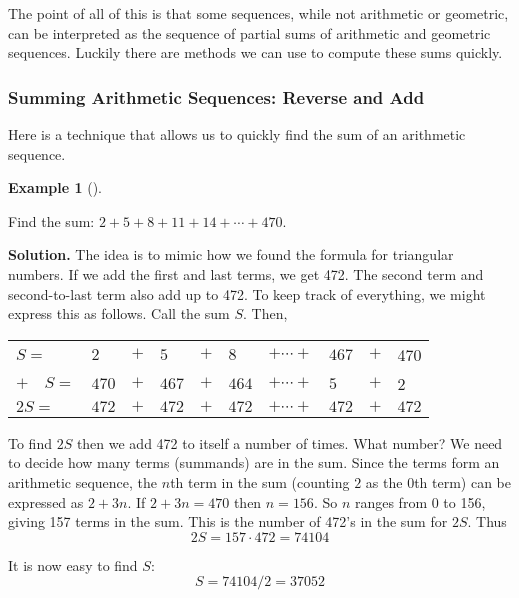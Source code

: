 \documentclass[10pt,]{book}
\theoremstyle{plain}
\theoremstyle{definition}
\newtheorem{example}[theorem]{Example}
\theoremstyle{definition}
\theoremstyle{definition}
\numberwithin{equation}{chapter}
\newcommand{\hrulethin}  {\noalign{\hrule height 0.04em}}
\begin{document}
        The point of all of this is that some sequences, while not arithmetic or geometric, can be interpreted as the sequence of partial sums of arithmetic and geometric sequences. Luckily there are methods we can use to compute these sums quickly.
\typeout{************************************************}
\typeout{************************************************}
\subsubsection[Summing Arithmetic Sequences: Reverse and Add]{Summing Arithmetic Sequences: Reverse and Add}\label{subsubsection-1}

        Here is a technique that allows us to quickly find the sum of an arithmetic sequence.
\begin{example}[]\label{example-63}

            Find the sum: \(2 + 5 + 8 + 11 + 14 + \cdots + 470\).
\par\medskip\noindent%
\textbf{Solution.}\quad
            The idea is to mimic how we found the formula for triangular numbers. If we add the first and last terms, we get 472. The second term and second-to-last term also add up to 472. To keep track of everything, we might express this as follows. Call the sum \(S\). Then,
\leavevmode%
\begin{table}
\centering
\begin{tabular}{llllllllll}
\(S  =\)&\(2\)&\(+\)&\(5\)&\(+\)&\(8\)&\(+ \cdots +\)&\(467\)&\(+\)&470\tabularnewline[0pt]
\(+ \quad S  =\)&\(470\)&\(+\)&\(467\)&\(+\)&\(464\)&\(+ \cdots +\)&\(5\)&\(+\)&2\tabularnewline\hrulethin
\(2S  =\)&\(472\)&\(+\)&\(472\)&\(+\)&\(472\)&\(+ \cdots +\)&\(472\)&\(+\)&\(472\)
\end{tabular}
\end{table}
\par

            To find \(2S\) then we add 472 to itself a number of times. What number? We need to decide how many terms (summands) are in the sum. Since the terms form an arithmetic sequence, the \(n\)th term in the sum (counting \(2\) as the 0th term) can be expressed as \(2 + 3n\). If \(2 + 3n = 470\) then \(n = 156\). So \(n\) ranges from 0 to 156, giving 157 terms in the sum. This is the number of 472's in the sum for \(2S\). Thus
            \begin{equation*}
              2S = 157\cdot 472 = 74104
            \end{equation*}
\par

            It is now easy to find \(S\):
            \begin{equation*}
              S = 74104/2 = 37052
            \end{equation*}
\end{example}
\par
\end{document}
